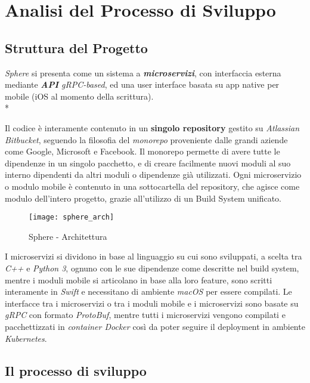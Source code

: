 \documentclass[../main.tex]{subfiles}
\begin{document}
    \chapter{Analisi del Processo di Sviluppo}
	
    	\section{Struttura del Progetto}
    	
    	    \emph{Sphere} si presenta come un sistema a \emph{\textbf{microservizi}}, con interfaccia esterna mediante \emph{\textbf{API} gRPC-based}, ed una user interface basata su app native per mobile (iOS al momento della scrittura).\\*
    	    
    	    Il codice è interamente contenuto in un \textbf{singolo repository} gestito su \emph{Atlassian Bitbucket}, seguendo la filosofia del \emph{monorepo}\cite{monorepo} proveniente dalle grandi aziende come Google, Microsoft e Facebook. Il monorepo permette di avere tutte le dipendenze in un singolo pacchetto, e di creare facilmente nuovi moduli al suo interno dipendenti da altri moduli o dipendenze già utilizzati. Ogni microservizio o modulo mobile è contenuto in una sottocartella del repository, che agisce come modulo dell'intero progetto, grazie all'utilizzo di un Build System unificato.
    	    
    	    \begin{figure}[h]
    			\centering
    			\texttt{[image: sphere\_arch]}
    			\caption{Sphere - Architettura}
    			\label{fig:sphere_arch}
    	    \end{figure}
    	    
    	    I microservizi si dividono in base al linguaggio su cui sono sviluppati, a scelta tra \emph{C++} e \emph{Python 3}, ognuno con le sue dipendenze come descritte nel build system, mentre i moduli mobile si articolano in base alla loro feature, sono scritti interamente in \emph{Swift} e necessitano di ambiente \emph{macOS} per essere compilati. Le interfacce tra i microservizi o tra i moduli mobile e i microservizi sono basate su \emph{gRPC} con formato \emph{ProtoBuf}, mentre tutti i microservizi vengono compilati e pacchettizzati in \emph{container Docker} così da poter seguire il deployment in ambiente \emph{Kubernetes}.
    	
    	\section{Il processo di sviluppo}
    	
\end{document}
